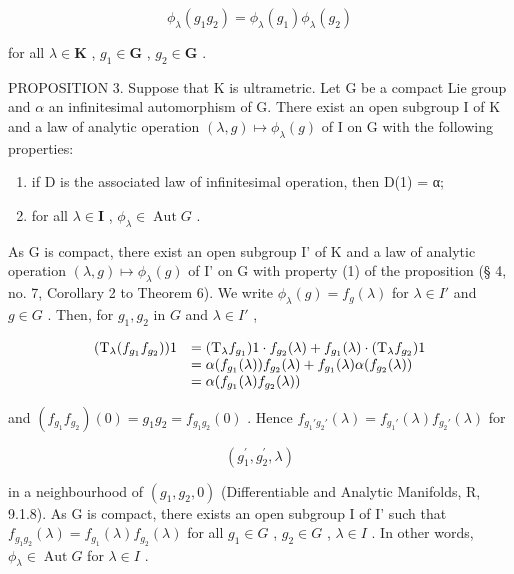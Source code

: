 \[
\phi_ {\lambda} (g _ {1} g _ {2}) = \phi_ {\lambda} (g _ {1}) \phi_ {\lambda} (g _ {2})
\]

for all \(\lambda \in \mathbf{K}\) , \(g_{1} \in \mathbf{G}\) , \(g_{2} \in \mathbf{G}\) .

PROPOSITION 3. Suppose that K is ultrametric. Let G be a compact Lie group and \(\alpha\) an infinitesimal automorphism of G. There exist an open subgroup I of K and a law of analytic operation \((\lambda, g) \mapsto \phi_{\lambda}(g)\) of I on G with the following properties:

\begin{enumerate}
\def\labelenumi{(\arabic{enumi})}
\item
  if D is the associated law of infinitesimal operation, then D(1) = α;
\item
  for all \(\lambda \in \mathbf{I}\) , \(\phi_{\lambda} \in \operatorname{Aut} G\) .
\end{enumerate}

As G is compact, there exist an open subgroup I' of K and a law of analytic operation \((\lambda, g) \mapsto \phi_{\lambda}(g)\) of I' on G with property (1) of the proposition (§ 4, no. 7, Corollary 2 to Theorem 6). We write \(\phi_{\lambda}(g) = f_{g}(\lambda)\) for \(\lambda \in I'\) and \(g \in G\) . Then, for \(g_{1}, g_{2}\) in \(G\) and \(\lambda \in I'\) ,

\[
\begin{array}{r l} (\mathrm{T} _ {\lambda} (f _ {g _ {1}} f _ {g _ {2}})) 1 & = (\mathrm{T} _ {\lambda} f _ {g _ {1}}) 1 \cdot f _ {g _ {2}} (\lambda) + f _ {g _ {1}} (\lambda) \cdot (\mathrm{T} _ {\lambda} f _ {g _ {2}}) 1 \\ & = \alpha (f _ {g _ {1}} (\lambda)) f _ {g _ {2}} (\lambda) + f _ {g _ {1}} (\lambda) \alpha (f _ {g _ {2}} (\lambda)) \\ & = \alpha (f _ {g _ {1}} (\lambda) f _ {g _ {2}} (\lambda)) \end{array}
\]

and \((f_{g_1}f_{g_2})(0) = g_1g_2 = f_{g_1g_2}(0)\) . Hence \(f_{g_1'g_2'}(\lambda) = f_{g_1'}(\lambda)f_{g_2'}(\lambda)\) for

\[
(g _ {1} ^ {\prime}, g _ {2} ^ {\prime}, \lambda)
\]

in a neighbourhood of \((g_1, g_2, 0)\) (Differentiable and Analytic Manifolds, R, 9.1.8). As G is compact, there exists an open subgroup I of I' such that \(f_{g_1 g_2}(\lambda) = f_{g_1}(\lambda) f_{g_2}(\lambda)\) for all \(g_1 \in G\) , \(g_2 \in G\) , \(\lambda \in I\) . In other words, \(\phi_\lambda \in \operatorname{Aut} G\) for \(\lambda \in I\) .

